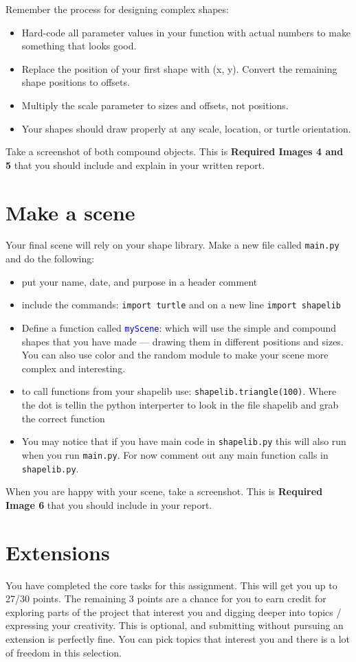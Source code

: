 \documentclass[12pt]{article}
\begin{document}
Remember the process for designing complex shapes:

\begin{itemize}
\item Hard-code all parameter values in your function with actual numbers to make something that looks good.
\item Replace the position of your first shape with (x, y). Convert the remaining shape positions to offsets.
\item Multiply the scale parameter to sizes and offsets, not positions.
\item Your shapes should draw properly at any scale, location, or turtle orientation.
\end{itemize}

Take a screenshot of both compound objects. This is \textbf{Required Images 4 and 5} that you should include and explain in your written report.


\section{Make a scene}
Your final scene will rely on your shape library.
Make a new file called \texttt{main.py} and do the following:
\begin{itemize}
\item put your name, date, and purpose in a header comment
\item include the commands: \texttt{import turtle} and on a new line \texttt{import shapelib}
\item Define a function called \textcolor{blue}{\texttt{myScene}}: which will use the simple and compound shapes that you have made — drawing them in different positions and sizes. You can also use color and the random module to make your scene more complex and interesting.
\item to call functions from your shapelib use: \texttt{shapelib.triangle(100)}. Where the dot is tellin the python interperter to look in the file shapelib and grab the correct function
\item You may notice that if you have main code in \texttt{shapelib.py} this will also run when you run \texttt{main.py}. For now comment out any main function calls in \texttt{shapelib.py}.
\end{itemize}

When you are happy with your scene, take a screenshot. This is \textbf{Required Image 6} that you should include in your report.

\section{Extensions}
You have completed the core tasks for this assignment. This will get you up to 27/30 points.
The remaining 3 points are a chance for you to earn credit for exploring parts of the project that interest you and digging deeper into topics / expressing your creativity.
This is optional, and submitting without pursuing an extension is perfectly fine.
You can pick topics that interest you and there is a lot of freedom in this selection.
\end{document}
